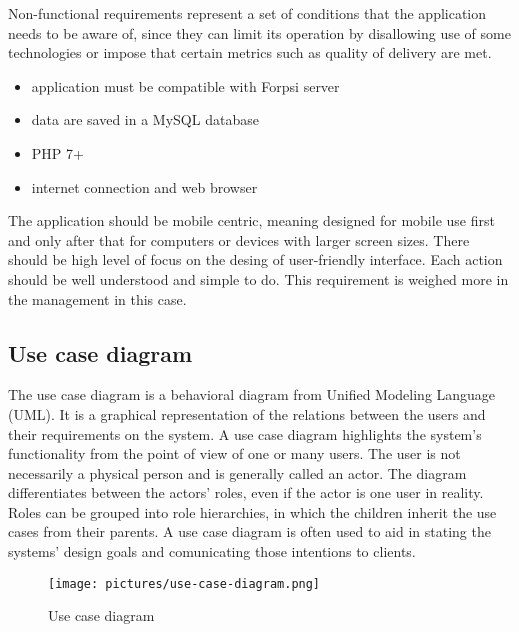 \documentclass[
  digital,     %
  oneside,     %
  nosansbold,  %
  colorbold, %
  lof,         %
  lot,         %
]{fithesis4}
\begin{document}
Non-functional requirements represent a set of conditions that the application needs to be aware of, since they can limit its operation by disallowing use of some technologies or impose that certain metrics such as quality of delivery are met.

\begin{itemize}
	\item application must be compatible with Forpsi server~\cite{forpsi}
	\item data are saved in a MySQL database
	\item PHP 7+
	\item internet connection and web browser
\end{itemize}

The application should be mobile centric, meaning designed for mobile use first and only after that for computers or devices with larger screen sizes. There should be high level of focus on the desing of user-friendly interface. Each action should be well understood and simple to do. This requirement is weighed more in the management in this case.

\subsection{Use case diagram}

The use case diagram is a behavioral diagram from Unified Modeling Language (UML). It is a graphical representation of the relations between the users and their requirements on the system. A use case diagram highlights the system's functionality from the point of view of one or many users. The user is not necessarily a physical person and is generally called an actor. The diagram differentiates between the actors' roles, even if the actor is one user in reality. Roles can be grouped into role hierarchies, in which the children inherit the use cases from their parents. A use case diagram is often used to aid in stating the systems' design goals and comunicating those intentions to clients.

\begin{figure}
	\begin{center}
		\begin{minipage}{1\textwidth}
			\texttt{[image: pictures/use-case-diagram.png]}
		\end{minipage}
	\end{center}
	\caption{Use case diagram}
	\label{fig:use-case}
\end{figure}
\end{document}
